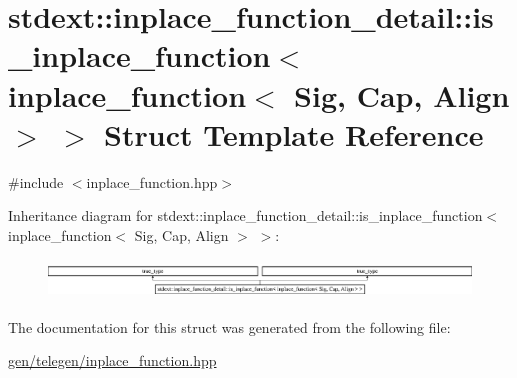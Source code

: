 \hypertarget{structstdext_1_1inplace__function__detail_1_1is__inplace__function_3_01inplace__function_3_01Sig_00_01Cap_00_01Align_01_4_01_4}{}\section{stdext\+:\+:inplace\+\_\+function\+\_\+detail\+:\+:is\+\_\+inplace\+\_\+function$<$ inplace\+\_\+function$<$ Sig, Cap, Align $>$ $>$ Struct Template Reference}
\label{structstdext_1_1inplace__function__detail_1_1is__inplace__function_3_01inplace__function_3_01Sig_00_01Cap_00_01Align_01_4_01_4}


{\ttfamily \#include $<$inplace\+\_\+function.\+hpp$>$}

Inheritance diagram for stdext\+:\+:inplace\+\_\+function\+\_\+detail\+:\+:is\+\_\+inplace\+\_\+function$<$ inplace\+\_\+function$<$ Sig, Cap, Align $>$ $>$\+:\begin{figure}[H]
\begin{center}
\leavevmode
\includegraphics[height=1.052632cm]{structstdext_1_1inplace__function__detail_1_1is__inplace__function_3_01inplace__function_3_01Sig_00_01Cap_00_01Align_01_4_01_4}
\end{center}
\end{figure}


The documentation for this struct was generated from the following file\+:\begin{DoxyCompactItemize}
\item 
\hyperlink{gen_2telegen_2inplace__function_8hpp}{gen/telegen/inplace\+\_\+function.\+hpp}\end{DoxyCompactItemize}
